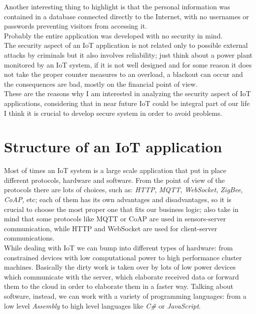 \documentclass[12pt]{report}
\begin{document}
Another interesting thing to highlight is that the personal information was contained in a database connected directly to the Internet, with no usernames or passwords preventing visitors from accessing it. \\Probably the entire application was developed with no security in mind.\\
 
The security aspect of an IoT application is not related only to possible external attacks by criminals but it also involves reliability; just think about a power plant monitored by an IoT system, if it is not well designed and for some reason it does not take the proper counter measures to an overload, a blackout can occur and the consequences are bad, mostly on the financial point of view.\\
These are the reasons why I am interested in analyzing the security aspect of IoT applications, considering that in near future
IoT could be integral part of our life I think it is crucial to develop secure system in order to avoid problems.


\section{Structure of an IoT application}
\bigskip
Most of times an IoT system is a large scale application that put in place different protocols, hardware and software.\newline
From the point of view of the protocols there are lots of choices, such as: \emph{HTTP}, \emph{MQTT}, \emph{WebSocket}, \emph{ZigBee}, \emph{CoAP}, etc; each of them has its own advantages and disadvantages, so it is crucial to choose the most proper one that fits our business logic; also take in mind that some protocols like MQTT or CoAP are used in sensors-server communication, while HTTP and WebSocket are used for client-server communications.\\

While dealing with IoT we can bump into different types of hardware: from constrained devices with low computational power to high performance cluster machines. Basically the dirty work is taken over by lots of low power devices which communicate with the server, which elaborate received data or forward them to the cloud in order to elaborate them in a faster way.\newline
Talking about software, instead, we can work with a variety of programming languages: from a low level \emph{Assembly} to high level languages like \emph{C\#} or \emph{JavaScript}.\\
\end{document}
